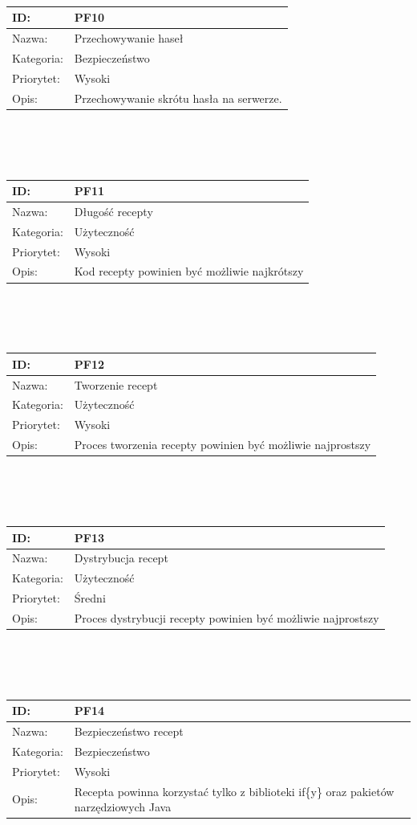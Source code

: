 \documentclass[11pt,a4paper,polish,thesis]{dcsbook}
\begin{document}
\begin{tabular}{|p{2cm}|p{12cm}|}
\\ \hline \end{tabular} \\\\\ \begin{tabular}{|p{2cm}|p{12cm}|}  \hline ID: &
PF10
\\ \hline Nazwa: &
Przechowywanie haseł
\\ \hline Kategoria: &
Bezpieczeństwo
\\ \hline Priorytet: &
Wysoki
\\ \hline Opis: &
Przechowywanie skrótu hasła na serwerze.
\\ \hline \end{tabular} \\\\\ \begin{tabular}{|p{2cm}|p{12cm}|}  \hline ID: &
PF11
\\ \hline Nazwa: &
Długość recepty
\\ \hline Kategoria: &
Użyteczność
\\ \hline Priorytet: &
Wysoki
\\ \hline Opis: &
Kod recepty powinien być możliwie najkrótszy
\\ \hline \end{tabular} \\\\\ \begin{tabular}{|p{2cm}|p{12cm}|}  \hline ID: &
PF12
\\ \hline Nazwa: &
Tworzenie recept
\\ \hline Kategoria: &
Użyteczność
\\ \hline Priorytet: &
Wysoki
\\ \hline Opis: &
Proces tworzenia recepty powinien być możliwie najprostszy
\\ \hline \end{tabular} \\\\\ \begin{tabular}{|p{2cm}|p{12cm}|}  \hline ID: &
PF13
\\ \hline Nazwa: &
Dystrybucja recept
\\ \hline Kategoria: &
Użyteczność
\\ \hline Priorytet: &
Średni
\\ \hline Opis: &
Proces dystrybucji recepty powinien być możliwie najprostszy
\\ \hline \end{tabular} \\\\\ \begin{tabular}{|p{2cm}|p{12cm}|}  \hline ID: &
PF14
\\ \hline Nazwa: &
Bezpieczeństwo recept
\\ \hline Kategoria: &
Bezpieczeństwo
\\ \hline Priorytet: &
Wysoki
\\ \hline Opis: &
Recepta powinna korzystać tylko z biblioteki if\{y\} oraz pakietów narzędziowych Java
\\ \hline \end{tabular}
\end{document}
